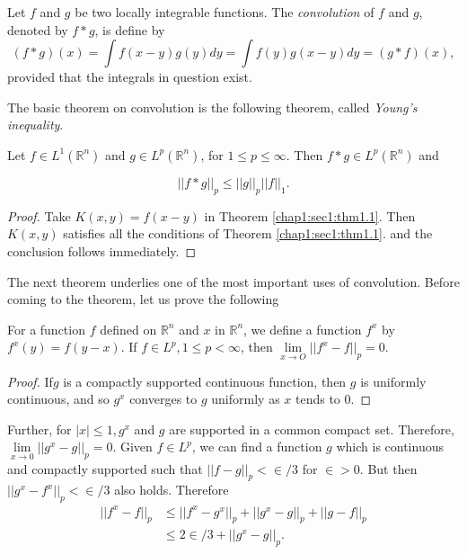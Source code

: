 \setcounter{defi}{1}
\begin{defi}\label{chap1:sec1:def1.2} %
Let $f$ and $g$ be two locally integrable functions. The {\em
  convolution} of $f$ and $g$, denoted by $f * g$, is define by  
$$
(f * g) (x) = \int f(x - y)g (y) dy = \int f(y)g (x-y)dy = (g*f)(x),
$$
provided that the integrals in question exist.
\end{defi}

The basic theorem on convolution is the following theorem, called
\textit {Young's inequality}.
 
\setcounter{thm}{2}
\begin{thm}\label{chap1:sec1:thm1.3}%
 Let $f \in L^1 (\mathbb{R}^n)$ and $g \in L^p
  (\mathbb{R}^n)$, for $1 \leq p \leq \infty$. Then $f*g \in L^p
  (\mathbb{R}^n)$ and  
\end{thm}
$$
|| f * g || _p \leq || g || _p || f || _1.
$$
\begin{proof}
  Take $K(x, y) = f(x - y)$ in Theorem \ref{chap1:sec1:thm1.1}. Then
  $K(x, y)$ satisfies 
  all the conditions of Theorem \ref{chap1:sec1:thm1.1}. and the
  conclusion follows immediately. 
\end{proof}

The next theorem underlies one of the most important uses of
convolution. Before coming to the theorem, let us prove the following  

\setcounter{lem}{3}
\begin{lem} \label{chap1:sec1:lem1.4}%
  For a function $f$ defined on $\mathbb{R}^n$ and $x$ in
  $\mathbb{R}^n$, we define a function $f^x$ by $f^x (y)=f(y-x)$. If $f
  \in L^p, 1 \leq p < \infty$, then $\lim\limits_{x \to O} || f^x -f
  ||_p=0$. 
\end{lem} 

\begin{proof}
  If\pageoriginale $g$ is a compactly supported continuous function,
  then $g$ is uniformly 
  continuous, and so $g^x$ converges to $g$ uniformly as $x$ tends
  to $0$. 
\end{proof}

Further, for $|x| \leq 1, g^x$ and $g$ are supported in a common
compact set. Therefore, $\lim\limits_{x \to 0} || g^x-g ||
_p=0$. Given $f \in L^p$, we can find a function $g$ which is
continuous and compactly supported such that $|| f-g ||_p < \in /3$
for $\in > 0$. But then $|| g^x-f^x ||_p < \in /3$ also
holds. Therefore 
\begin{align*}
  || f^x-f || _p & \leq || f^x -g^x ||_p +|| g^x -g
  ||_p + || g-f ||_p \\ 
  & \leq 2 \in /3 + || g^x -g || _p.
\end{align*}

